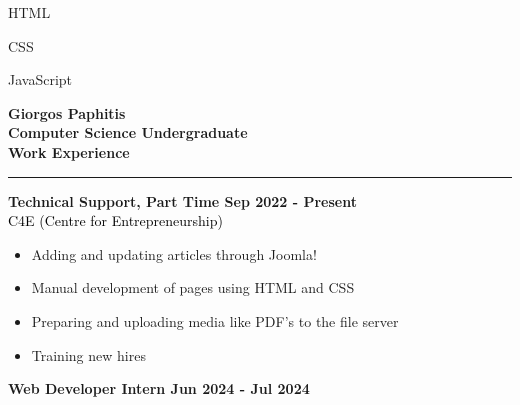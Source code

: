 \documentclass[12pt]{article}
\begin{document}
\begin{paracol}{2}
\begin{tcolorbox}[colback=bgcolor, colframe=bgcolor, boxrule=0cm, arc=0cm, outer arc=0cm, left=0.35cm, right=0.10cm, top=1cm, bottom=1.5cm,height=\textheight]
{\begin{itemize}[leftmargin=15pt, itemsep=0pt, topsep=0pt]
\begin{multicols}{2}
            \item HTML\\
            \item CSS\\
            \item JavaScript\\
         \end{multicols}
      \end{itemize}
      }
   \end{tcolorbox}
   \switchcolumn
      \vspace*{1.7cm}
      \textbf{\Huge \textcolor{bgcolor}{Giorgos Paphitis}}\\[0.5em]
      \textbf{Computer Science Undergraduate}\\
      \vspace{1.5cm}
      {\fontsize{14pt}{13pt}\selectfont
      \textbf{\textcolor{bgcolor}{Work Experience}}\\[0.3em]
      }
      \hrule
      \vspace{0.5cm}
      \textbf{\textcolor{bgcolor}{Technical Support, Part Time \hfill Sep 2022 - Present}}\\[0.5em]
      \textcolor{black}{C4E (Centre for Entrepreneurship)}\\[0.5em]
      {\renewcommand{\labelitemi}{\textcolor{bgcolor}{\normalsize$\bullet$}}%
      \begin{itemize}[leftmargin=33pt, itemsep=0pt, topsep=0pt]
            \item Adding and updating articles through Joomla!\\
            \item Manual development of pages using HTML and CSS\\
            \item Preparing and uploading media like PDF's to the file server\\
            \item Training new hires\\
         \end{itemize}
      }
      \vspace{0.5cm}
      \textbf{\textcolor{bgcolor}{Web Developer Intern \hfill Jun 2024 - Jul 2024}}\\[0.5em]

\end{paracol}
\end{document}
